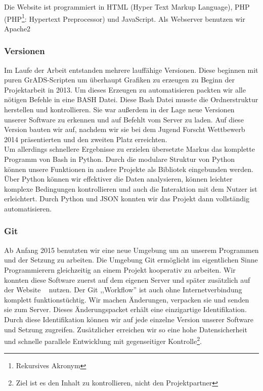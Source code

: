 Die Website ist programmiert in HTML (Hyper Text Markup Language), PHP (PHP\footnote{Rekursives Akronym}: Hypertext Preprocessor) und JavaScript.
Als Webserver benutzen wir Apache2 \cite{php} \cite{apache} \\

\subsubsection{Versionen}
Im Laufe der Arbeit entstanden mehrere lauffähige Versionen.
Diese beginnen mit puren GrADS-Scripten um überhaupt Grafiken zu erzeugen zu Beginn der Projektarbeit in 2013.
Um dieses Erzeugen zu automatisieren packten wir alle nötigen Befehle in eine BASH Datei.
Diese Bash Datei musste die Ordnerstruktur herstellen und kontrollieren.
Sie war außerdem in der Lage neue Versionen unserer Software zu erkennen und auf Befehlt vom Server zu laden.
Auf diese Version bauten wir auf,
nachdem wir sie bei dem Jugend Forscht Wettbewerb 2014 präsentierten und den zweiten Platz erreichten.\\
Um allerdings schnellere Ergebnisse zu erzielen übersetzte Markus das komplette Programm von Bash in Python.
Durch die modulare Struktur von Python können unsere Funktionen in andere Projekte als Bibliotek eingebunden werden.\\
Über Python können wir effektiver die Daten analysieren, können leichter komplexe Bedingungen kontrollieren und auch die Interaktion mit dem Nutzer ist erleichtert.
Durch Python und JSON konnten wir das Projekt dann vollständig automatisieren.

\subsubsection*{Git}
Ab Anfang 2015 benutzten wir eine neue Umgebung um an unserem Programmen und der Setzung zu arbeiten.
Die Umgebung Git %
ermöglicht im eigentlichen Sinne Programmierern gleichzeitig an einem Projekt kooperativ zu arbeiten.
Wir konnten diese Software zuerst auf dem eigenen Server und später zusätzlich auf der Website  %
nutzen.
Der Git ,,Workflow'' ist auch ohne Internetverbindung komplett funktionstüchtig.
Wir machen Änderungen, verpacken sie und senden sie zum Server.
Dieses Änderungspacket erhält eine einzigartige Identifikation.
Durch diese Identifikation können wir auf jede einzelne Version unserer Software und Setzung zugreifen.
Zusätzlicher erreichen wir so eine hohe Datensicherheit und schnelle parallele Entwicklung mit gegenseitiger Kontrolle\footnote{Ziel ist es den Inhalt zu kontrollieren, nicht den Projektpartner}.

